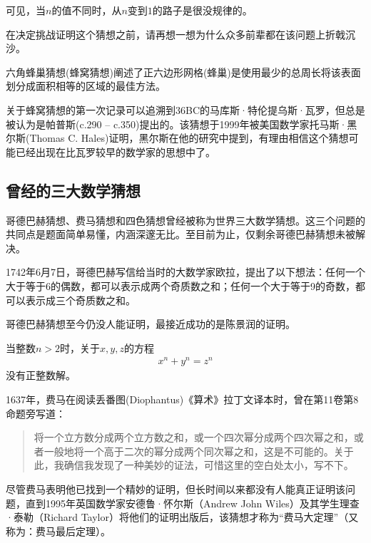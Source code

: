 可见，当$n$的值不同时，从$n$变到$1$的路子是很没规律的。

在决定挑战证明这个猜想之前，请再想一想为什么众多前辈都在该问题上折戟沉沙。


\begin{example}
  六角蜂巢猜想(蜂窝猜想)阐述了正六边形网格(蜂巢)是使用最少的总周长将该表面划分成面积相等的区域的最佳方法。
\end{example}

关于蜂窝猜想的第一次记录可以追溯到36BC的马库斯·特伦提乌斯·瓦罗，但总是被认为是帕普斯(c.290 – c.350)提出的。该猜想于1999年被美国数学家托马斯·黑尔斯(Thomas C. Hales)证明，黑尔斯在他的研究中提到，有理由相信这个猜想可能已经出现在比瓦罗较早的数学家的思想中了。

\subsection{曾经的三大数学猜想}
\label{sec:3-math-conjectures}

哥德巴赫猜想、费马猜想和四色猜想曾经被称为世界三大数学猜想。这三个问题的共同点是题面简单易懂，内涵深邃无比。至目前为止，仅剩余哥德巴赫猜想未被解决。

\begin{example}\label{ex:Goldbach-conjecture}
  1742年6月7日，哥德巴赫写信给当时的大数学家欧拉，提出了以下想法：任何一个大于等于6的偶数，都可以表示成两个奇质数之和；任何一个大于等于9的奇数，都可以表示成三个奇质数之和。
\end{example}

哥德巴赫猜想至今仍没人能证明，最接近成功的是陈景润的证明。

\begin{example}
  当整数$n>2$时，关于$x,y,z$的方程
  \begin{align*}
    x^n+y^n=z^n
  \end{align*}
  没有正整数解。
\end{example}
1637年，费马在阅读丢番图(Diophantus)《算术》拉丁文译本时，曾在第11卷第8命题旁写道：

\begin{quotation}
  将一个立方数分成两个立方数之和，或一个四次幂分成两个四次幂之和，或者一般地将一个高于二次的幂分成两个同次幂之和，这是不可能的。关于此，我确信我发现了一种美妙的证法，可惜这里的空白处太小，写不下。
\end{quotation}

尽管费马表明他已找到一个精妙的证明，但长时间以来都没有人能真正证明该问题，直到1995年英国数学家安德鲁·怀尔斯（Andrew John Wiles）及其学生理查·泰勒（Richard Taylor）将他们的证明出版后，该猜想才称为“费马大定理”（又称为：费马最后定理）。



